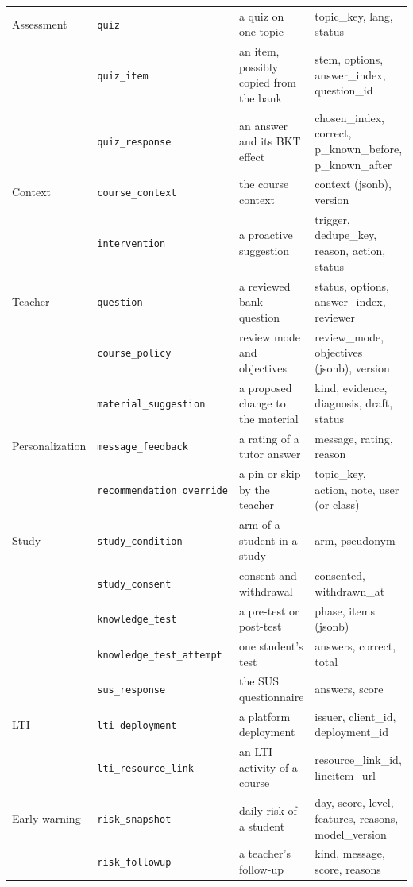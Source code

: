 \begin{table}[htbp]
\begin{tabularx}{\textwidth}{@{}L{2.0cm}L{3.4cm}YL{3.6cm}@{}}
Assessment & \texttt{quiz} & a quiz on one topic & topic\_key, lang, status \\
 & \texttt{quiz\_item} & an item, possibly copied from the bank & stem, options, answer\_index, question\_id \\
 & \texttt{quiz\_response} & an answer and its BKT effect & chosen\_index, correct, p\_known\_before, p\_known\_after \\
Context & \texttt{course\_context} & the course context & context (jsonb), version \\
 & \texttt{intervention} & a proactive suggestion & trigger, dedupe\_key, reason, action, status \\
Teacher & \texttt{question} & a reviewed bank question & status, options, answer\_index, reviewer \\
 & \texttt{course\_policy} & review mode and objectives & review\_mode, objectives (jsonb), version \\
 & \texttt{material\_suggestion} & a proposed change to the material & kind, evidence, diagnosis, draft, status \\
Personalization & \texttt{message\_feedback} & a rating of a tutor answer & message, rating, reason \\
 & \texttt{recommendation\_override} & a pin or skip by the teacher & topic\_key, action, note, user (or class) \\
Study & \texttt{study\_condition} & arm of a student in a study & arm, pseudonym \\
 & \texttt{study\_consent} & consent and withdrawal & consented, withdrawn\_at \\
 & \texttt{knowledge\_test} & a pre-test or post-test & phase, items (jsonb) \\
 & \texttt{knowledge\_test\_attempt} & one student's test & answers, correct, total \\
 & \texttt{sus\_response} & the SUS questionnaire & answers, score \\
LTI & \texttt{lti\_deployment} & a platform deployment & issuer, client\_id, deployment\_id \\
 & \texttt{lti\_resource\_link} & an LTI activity of a course & resource\_link\_id, lineitem\_url \\
Early warning & \texttt{risk\_snapshot} & daily risk of a student & day, score, level, features, reasons, model\_version \\
 & \texttt{risk\_followup} & a teacher's follow-up & kind, message, score, reasons \\
\bottomrule
\end{tabularx}
\end{table}

